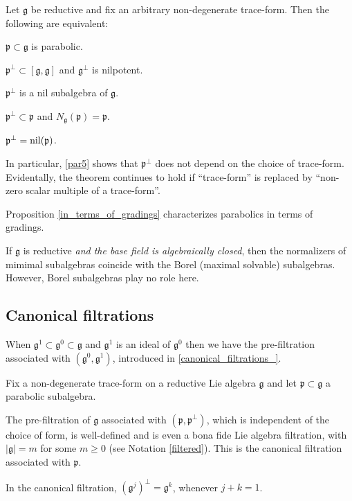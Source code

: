 \documentclass[leqno,12pt]{amsart} %
\begin{document}
\begin{theorem}
  Let ${\mathfrak g} $ be reductive and fix an arbitrary non-degenerate
  trace-form. Then the following are equivalent:
  \begin{conditions}
  \item\label{par1} ${\mathfrak p} \subset {\mathfrak g} $ is parabolic.
  \item\label{par2} ${\mathfrak p}^\perp \subset [{\mathfrak g}, {\mathfrak g}]$ and
    ${\mathfrak g}^\perp$ is nilpotent.
  \item\label{par3} ${\mathfrak p}^\perp$ is a nil subalgebra of ${\mathfrak g} $.
  \item \label{par4} ${\mathfrak p}^\perp \subset {\mathfrak p} $ and
    $N_{\mathfrak g}({\mathfrak p}) = {\mathfrak p}$.
  \item\label{par5} ${\mathfrak p}^\perp=\operatorname{\operatorname{nil}}({\mathfrak p})$.
  \end{conditions}
\end{theorem}
\noindent%
In particular, \eqref{par5} shows that ${\mathfrak p}^\perp $ does not depend on the
choice of trace-form. Evidentally, the theorem continues to hold if ``trace-form'' is
replaced by ``non-zero scalar multiple of a trace-form''.

Proposition \ref{in_terms_of_gradings} characterizes parabolics in terms of gradings.

\begin{remark}
  If ${\mathfrak g} $ is reductive {\em and the base field is algebraically closed}, then
  the normalizers of mimimal subalgebras coincide with the Borel (maximal solvable)
  subalgebras. However, Borel subalgebras play no role here.
\end{remark}

\subsection{Canonical filtrations}\label{can}
When ${\mathfrak g}^1 \subset {\mathfrak g}^0 \subset {\mathfrak g} $ and
${\mathfrak g}^1$ is an ideal of ${\mathfrak g}^0$ then we have the {\df
  pre-filtration} associated with $({\mathfrak g}^0, {\mathfrak g}^1)$, introduced in
\ref{canonical_filtrations_}.

\begin{proposition}
  Fix a non-degenerate trace-form on a reductive Lie algebra ${\mathfrak g}$ and let
  ${\mathfrak p} \subset {\mathfrak g} $ a parabolic subalgebra.
  \begin{conditions}
  \item\label{hosp1} The pre-filtration of ${\mathfrak g} $ associated with
    $({\mathfrak p}, {\mathfrak p}^\perp )$, which is independent of the choice of form,
    is well-defined and is even a bona fide Lie algebra filtration, with
    $|{\mathfrak g}| = m $ for some $m\ge 0$ (see Notation \ref{filtered}). This is the
    {\df canonical filtration} associated with ${\mathfrak p} $.
  \item\label{hosp2} In the canonical filtration,
    $({\mathfrak g}^j)^\perp = {\mathfrak g}^k$, whenever $j + k =1$.
  \end{conditions}
\end{proposition}
\noindent%
\end{document}

